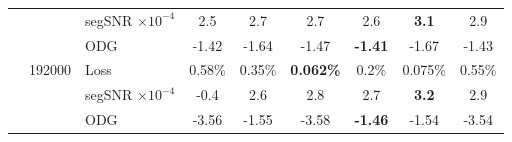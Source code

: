 {\begin{tabular}{@{}l|c|l|c|c|c|c|c|c|@{}}
        \multicolumn{1}{|l|}{} &  & \makecell{segSNR\\$\times 10^{-4}$}  & 2.5              & 2.7          & 2.7 & 2.6 & \textbf{3.1} & 2.9 \\ \cmidrule(l){3-9} 
        \multicolumn{1}{|l|}{} &  & ODG     & -1.42                 & -1.64             & -1.47 & \textbf{-1.41} & -1.67 & -1.43 \\ \cmidrule(l){2-9} 
        \multicolumn{1}{|l|}{} & \multirow{3}{*}{192000} & 
                                    Loss    & 0.58\%                & 0.35\%            & \textbf{0.062\%} & 0.2\% & 0.075\% & 0.55\% \\ \cmidrule(l){3-9} 
        \multicolumn{1}{|l|}{} &  & \makecell{segSNR\\$\times 10^{-4}$}  & -0.4             & 2.6          & 2.8 & 2.7 & \textbf{3.2} & 2.9 \\ \cmidrule(l){3-9} 
        \multicolumn{1}{|l|}{} &  & ODG     & -3.56                 & -1.55             & -3.58 & \textbf{-1.46} & -1.54 & -3.54 \\ \bottomrule
    \end{tabular}%
    }